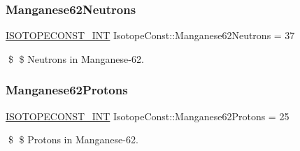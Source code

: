 \subsubsection{\texorpdfstring{Manganese62\+Neutrons}{Manganese62Neutrons}}
{\footnotesize\ttfamily \mbox{\hyperlink{group___isotope_const-_macros_ga5f18360b3e99483a35c32d789e62621c}{I\+S\+O\+T\+O\+P\+E\+C\+O\+N\+S\+T\+\_\+\+I\+NT}} Isotope\+Const\+::\+Manganese62\+Neutrons = 37}

\$ \$ Neutrons in Manganese-\/62. \mbox{\label{group___isotope_const-_manganese-_mn62_ga8e56ee0c1d77f7edb5bb0c2447dd150e}} 
\subsubsection{\texorpdfstring{Manganese62\+Protons}{Manganese62Protons}}
{\footnotesize\ttfamily \mbox{\hyperlink{group___isotope_const-_macros_ga5f18360b3e99483a35c32d789e62621c}{I\+S\+O\+T\+O\+P\+E\+C\+O\+N\+S\+T\+\_\+\+I\+NT}} Isotope\+Const\+::\+Manganese62\+Protons = 25}

\$ \$ Protons in Manganese-\/62. 